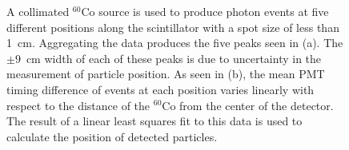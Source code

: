 \begin{figure}[]
    \centering
    

    \caption{
    A collimated $^{60}$Co source is used to produce photon events at five different positions along the scintillator with a spot size of less than 1~cm.
    Aggregating the data produces the five peaks seen in (a).
    The $\pm9$~cm width of each of these peaks is due to uncertainty in the measurement of particle position.
    As seen in (b), the mean PMT timing difference of events at each position varies linearly with respect to the distance of the $^{60}$Co from the center of the detector. 
    The result of a linear least squares fit to this data is used to calculate the position of detected particles.
    }
    \label{fig:PMTDifference}
\end{figure}


